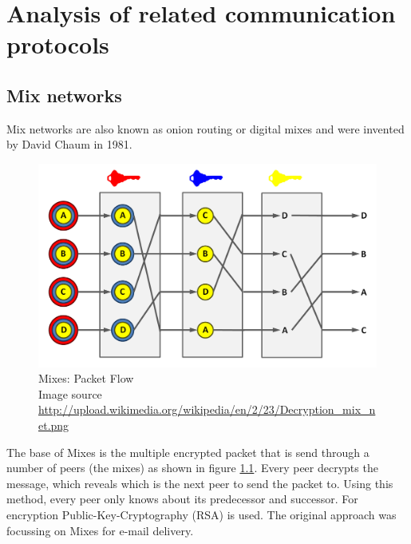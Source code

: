 \chapter{Analysis of related communication protocols}

\section{Mix networks}
Mix networks are also known as onion routing or digital mixes and
were invented by David Chaum in 1981.\cite{Chaum:1981:UEM:358549.358563}
\begin{figure}
    \centering
    \caption[Mixes: Packet Flow]{Mixes: Packet Flow\\Image source \url{http://upload.wikimedia.org/wikipedia/en/2/23/Decryption_mix_net.png}}
    \label{mixesflow}
    \includegraphics[scale=0.3]{Decryption_mix_net.png}
\end{figure}
The base of Mixes is the multiple encrypted packet that is send through a
number of peers (the mixes) as shown in figure \ref{mixesflow}.
Every peer decrypts the message, which reveals which is the next peer
to send the packet to. Using this method, every peer only knows about
its predecessor and successor. For encryption Public-Key-Cryptography (RSA) is used.
The original approach was focussing on Mixes for e-mail delivery.
